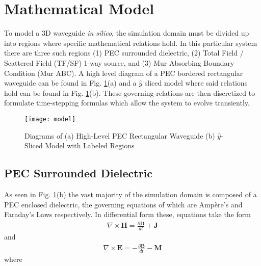 \section{Mathematical Model}
\label{sec:mathmod}

To model a 3D waveguide \textit{in silico}, the simulation domain must be divided up into regions where specific mathematical relations hold. In this particular system there are three such regions (1) PEC surrounded dielectric, (2) Total Field / Scattered Field (TF/SF) 1-way source, and (3) Mur Absorbing Boundary Condition (Mur ABC). A high level diagram of a PEC bordered rectangular waveguide can be found in Fig. \ref{fig:model}(a) and a $\hat{y}$ sliced model where said relations hold can be found in Fig. \ref{fig:model}(b). These governing relations are then discretized to formulate time-stepping formulas which allow the system to evolve transiently.

\begin{figure}[t!]  
	\centering
	\texttt{[image: model]} 
	\caption{Diagrams of (a) High-Level PEC Rectangular Waveguide (b) $\hat{y}$-Sliced Model with Labeled Regions}
	\label{fig:model}
\end{figure}

\subsection{PEC Surrounded Dielectric}
\label{subsec:dielectric} 


As seen in Fig. \ref{fig:model}(b) the vast majority of the simulation domain is composed of a PEC enclosed dielectric, the governing equations of which are Amp\`{e}re's and Faraday's Laws respectively. In differential form these, equations take the form 
\begin{align}
    \nabla\times\textbf{H} = \frac{\partial\textbf{D}}{dt} + \textbf{J}
    \label{eq:ampere}
\end{align}
and 
\begin{align}
    \nabla\times\textbf{E}=-\frac{\partial\textbf{B}}{dt} - \textbf{M}
    \label{eq:faraday}
\end{align}
where 

